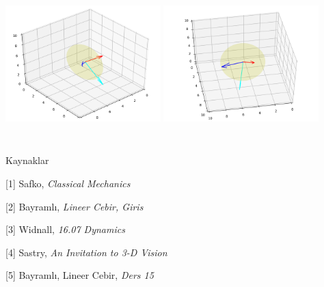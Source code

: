 \documentclass[12pt,fleqn]{article}\usepackage{../../common}
\begin{document}
\includegraphics[height=6cm,width=6cm]{vision_02_03.png}
\includegraphics[height=6cm,width=6cm]{vision_02_04.png}


Kaynaklar

[1] Safko, {\em Classical Mechanics}

[2] Bayramlı, {\em Lineer Cebir, Giris}

[3] Widnall, {\em 16.07 Dynamics}

[4] Sastry, {\em An Invitation to 3-D Vision}

[5] Bayramlı, Lineer Cebir, {\em Ders 15}
\end{document}
